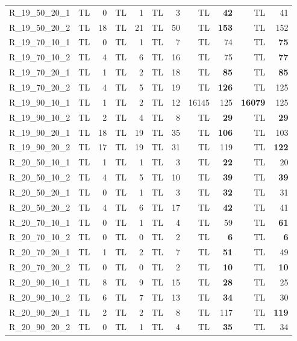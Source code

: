 \documentclass{article}
\begin{document}
\begin{longtable}{lrrrrrrrrrr}
R\_19\_50\_20\_1 & TL & 0 & TL & 1 & TL & 3 & TL & \textbf{42} & TL & 41 \\
R\_19\_50\_20\_2 & TL & 18 & TL & 21 & TL & 50 & TL & \textbf{153} & TL & 152 \\
R\_19\_70\_10\_1 & TL & 0 & TL & 1 & TL & 7 & TL & 74 & TL & \textbf{75} \\
R\_19\_70\_10\_2 & TL & 4 & TL & 6 & TL & 16 & TL & 75 & TL & \textbf{77} \\
R\_19\_70\_20\_1 & TL & 1 & TL & 2 & TL & 18 & TL & \textbf{85} & TL & \textbf{85} \\
R\_19\_70\_20\_2 & TL & 4 & TL & 5 & TL & 19 & TL & \textbf{126} & TL & 125 \\
R\_19\_90\_10\_1 & TL & 1 & TL & 2 & TL & 12 & 16145 & 125 & \textbf{16079} & 125 \\
R\_19\_90\_10\_2 & TL & 2 & TL & 4 & TL & 8 & TL & \textbf{29} & TL & \textbf{29} \\
R\_19\_90\_20\_1 & TL & 18 & TL & 19 & TL & 35 & TL & \textbf{106} & TL & 103 \\
R\_19\_90\_20\_2 & TL & 17 & TL & 19 & TL & 31 & TL & 119 & TL & \textbf{122} \\
R\_20\_50\_10\_1 & TL & 1 & TL & 1 & TL & 3 & TL & \textbf{22} & TL & 20 \\
R\_20\_50\_10\_2 & TL & 4 & TL & 5 & TL & 10 & TL & \textbf{39} & TL & \textbf{39} \\
R\_20\_50\_20\_1 & TL & 0 & TL & 1 & TL & 3 & TL & \textbf{32} & TL & 31 \\
R\_20\_50\_20\_2 & TL & 4 & TL & 6 & TL & 17 & TL & \textbf{42} & TL & 41 \\
R\_20\_70\_10\_1 & TL & 0 & TL & 1 & TL & 4 & TL & 59 & TL & \textbf{61} \\
R\_20\_70\_10\_2 & TL & 0 & TL & 0 & TL & 2 & TL & \textbf{6} & TL & \textbf{6} \\
R\_20\_70\_20\_1 & TL & 1 & TL & 2 & TL & 7 & TL & \textbf{51} & TL & 49 \\
R\_20\_70\_20\_2 & TL & 0 & TL & 0 & TL & 2 & TL & \textbf{10} & TL & \textbf{10} \\
R\_20\_90\_10\_1 & TL & 8 & TL & 9 & TL & 15 & TL & \textbf{28} & TL & 25 \\
R\_20\_90\_10\_2 & TL & 6 & TL & 7 & TL & 13 & TL & \textbf{34} & TL & 30 \\
R\_20\_90\_20\_1 & TL & 2 & TL & 2 & TL & 8 & TL & 117 & TL & \textbf{119} \\
R\_20\_90\_20\_2 & TL & 0 & TL & 1 & TL & 4 & TL & \textbf{35} & TL & 34 
\end{longtable}
\endgroup{}
\end{document}
